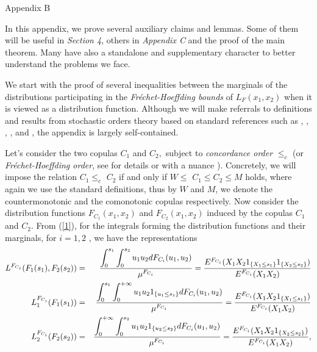 \documentclass[onecolumn]{article}
\providecommand{\dint}{\displaystyle\int}
\renewcommand{\dint}{\displaystyle\int}
\begin{document}
\pagebreak

\begin{flushleft}
{\Large Appendix B}\hfill
\end{flushleft}

In this appendix, we prove several auxiliary claims and lemmas. Some of them
will be useful in \textit{Section 4}, others in \textit{Appendix C} and the
proof of the main theorem. Many have also a standalone and supplementary
character to better understand the problems we face.

We start with the proof of several inequalities between the marginals of the
distributions participating in the \textit{Fr\'{e}chet-Hoeffding bounds} of $%
L_{F}(x_{1},x_{2})$ when it is viewed as a distribution function. Although
we will make referrals to definitions and results from stochastic orders
theory based on standard references such as \cite{[27]}, \cite{[28]}, \cite%
{[25]}, \cite{[5]}, and \cite{[24]}, the appendix is largely self-contained.

Let's consider the two copulas $C_{1}$ and $C_{2},$ subject to \textit{%
concordance order} $\leq _{c}$ (or \textit{Fr\'{e}chet-Hoeffding order}, see
for details \cite[Definition 2.8.1]{[25]} or with a nuance \cite[Definition
3.8.5]{[28]}). Concretely, we will impose the relation $C_{1}\leq _{c}$ $%
C_{2}$ if and only if $W\leq $ $C_{1}\leq C_{2}\leq M$ holds, where again we
use the standard definitions, thus by $W$ and $M$, we denote the
countermonotonic and the comonotonic copulas respectively. Now consider the
distribution functions $F_{C_{1}}(x_{1},x_{2})$ and $F_{C_{2}}(x_{1},x_{2})$
induced by the copulas $C_{1}$ and $C_{2}$. From (\ref{1}), for the
integrals forming the distribution functions and their marginals, for $i=1,2$%
, we have the representations 
\begin{eqnarray}
L^{F_{C_{i}}}(F_{1}(s_{1}),F_{2}(s_{2})) &=&\frac{\dint\nolimits_{0}^{s_{1}}%
\dint\nolimits_{0}^{s_{2}}u_{1}u_{2}dF_{C_{i}}(u_{1},u_{2})}{\mu ^{F_{C_{i}}}%
}=\frac{E^{F_{C_{i}}}(X_{1}X_{2}1_{\{X_{1}\leq s_{1}\}}1_{\{X_{2}\leq
s_{2}\}})}{E^{F_{C_{i}}}(X_{1}X_{2})}  \label{220} \\
L_{1}^{F_{C_{i}}}(F_{1}(s_{1})) &=&\frac{\dint\nolimits_{0}^{s_{1}}\dint%
\nolimits_{0}^{+\infty }u_{1}u_{2}1_{\{u_{1}\leq
s_{1}\}}dF_{C_{i}}(u_{1},u_{2})}{\mu ^{F_{C_{i}}}}=\frac{%
E^{F_{C_{i}}}(X_{1}X_{2}1_{\{X_{1}\leq s_{1}\}})}{E^{F_{C_{i}}}(X_{1}X_{2})}
\label{221} \\
L_{2}^{F_{C_{i}}}(F_{2}(s_{2})) &=&\frac{\dint\nolimits_{0}^{+\infty
}\dint\nolimits_{0}^{s_{2}}u_{1}u_{2}1_{\{u_{2}\leq
s_{2}\}}dF_{C_{i}}(u_{1},u_{2})}{\mu ^{F_{C_{i}}}}=\frac{%
E^{F_{C_{i}}}(X_{1}X_{2}1_{\{X_{2}\leq s_{2}\}})}{E^{F_{C_{i}}}(X_{1}X_{2})},
\label{222}
\end{eqnarray}
\end{document}
